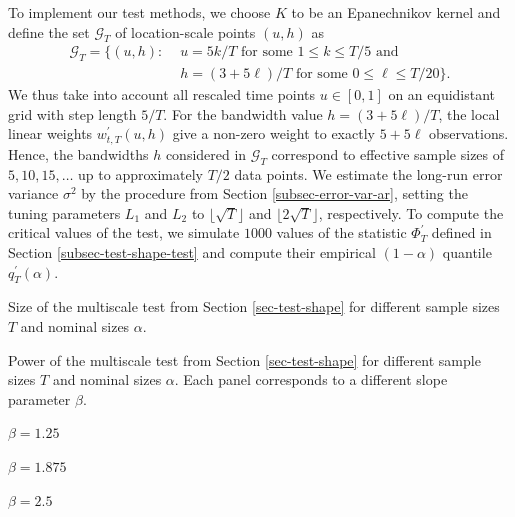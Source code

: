To implement our test methods, we choose $K$ to be an Epanechnikov kernel and define the set $\mathcal{G}_T$ of location-scale points $(u,h)$ as
\begin{align}
\mathcal{G}_T = \big\{ (u, h): & \, \, u = 5k/T \text{ for some } 1 \le k \le T/5 \text{ and } \nonumber \\ & \, \, h = (3+5\ell)/T \text{ for some } 0 \le \ell \le T/20 \big\}. \label{grid-sim-app}
\end{align}
We thus take into account all rescaled time points $u \in [0,1]$ on an equidistant grid with step length $5/T$. For the bandwidth value $h = (3 + 5\ell)/T$, the local linear weights $w_{t,T}^\prime(u,h)$ give a non-zero weight to exactly $5 + 5 \ell$ observations. Hence, the bandwidths $h$ considered in $\mathcal{G}_T$ correspond to effective sample sizes of $5, 10, 15, \ldots$ up to approximately $T/2$ data points. 
We estimate the long-run error variance $\sigma^2$ by the procedure from Section \ref{subsec-error-var-ar}, setting the tuning parameters $L_1$ and $L_2$ to $\lfloor \sqrt{T} \rfloor$ and $\lfloor 2\sqrt{T} \rfloor$, respectively. To compute the critical values of the test, we simulate $1000$ values of the statistic $\Phi^\prime_T$ defined in Section \ref{subsec-test-shape-test} and compute their empirical $(1-\alpha)$ quantile $q_T^\prime(\alpha)$. 


\begin{table}[t]
\footnotesize{
\begin{center}
\caption{Size of the multiscale test from Section \ref{sec-test-shape} for different sample sizes $T$ and nominal sizes $\alpha$.}
\label{tab:size_shape}
\renewcommand{\arraystretch}{1.2}

\end{center}}
\footnotesize{
\begin{center}
\caption{Power of the multiscale test from Section \ref{sec-test-shape} for different sample sizes $T$ and nominal sizes $\alpha$. Each panel corresponds to a different slope parameter $\beta$.}\label{tab:power_shape}
\begin{subtable}[b]{0.32\textwidth}
\centering
\caption{$\beta = 1.25$}\label{tab:power_050_ll_shape}
\renewcommand{\arraystretch}{1.2}

\end{subtable}
\begin{subtable}[b]{0.32\textwidth}
\centering
\caption{$\beta = 1.875$}\label{tab:power_075_ll_shape}
\renewcommand{\arraystretch}{1.2}

\end{subtable}
\begin{subtable}[b]{0.32\textwidth}
\centering
\caption{$\beta = 2.5$}\label{tab:power_100_ll_shape}
\renewcommand{\arraystretch}{1.2}

\end{subtable}
\end{center}}
\end{table}


